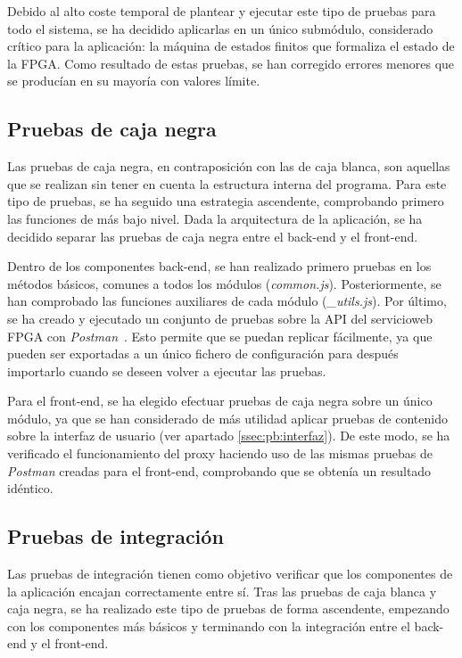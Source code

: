 Debido al alto coste temporal de plantear y ejecutar este tipo de pruebas para todo el sistema, se ha decidido aplicarlas en un único submódulo, considerado crítico para la aplicación: la máquina de estados finitos que formaliza el estado de la \gls{FPGA}.
Como resultado de estas pruebas, se han corregido errores menores que se producían en su mayoría con valores límite.

\subsection*{Pruebas de caja negra\label{ssec:pb:caja_negra}}

Las pruebas de caja negra, en contraposición con las de caja blanca, son aquellas que se realizan sin tener en cuenta la estructura interna del programa.
Para este tipo de pruebas, se ha seguido una estrategia ascendente, comprobando primero las funciones de más bajo nivel.
Dada la arquitectura de la aplicación, se ha decidido separar las pruebas de caja negra entre el \gls{back-end} y el \gls{front-end}.

Dentro de los componentes \gls{back-end}, se han realizado primero pruebas en los métodos básicos, comunes a todos los módulos (\textit{common.js}).
Posteriormente, se han comprobado las funciones auxiliares de cada módulo (\textit{\_utils.js}).
Por último, se ha creado y ejecutado un conjunto de pruebas sobre la \gls{API} del \gls{servicioweb} \gls{FPGA} con \textit{Postman}~\cite{postman}.
Esto permite que se puedan replicar fácilmente, ya que pueden ser exportadas a un único fichero de configuración para después importarlo cuando se deseen volver a ejecutar las pruebas.

Para el \gls{front-end}, se ha elegido efectuar pruebas de caja negra sobre un único módulo, ya que se han considerado de más utilidad aplicar pruebas de contenido sobre la interfaz de usuario (ver apartado \ref{ssec:pb:interfaz}).
De este modo, se ha verificado el funcionamiento del \gls{proxy} haciendo uso de las mismas pruebas de \textit{Postman} creadas para el \gls{front-end}, comprobando que se obtenía un resultado idéntico.

\subsection*{Pruebas de integración\label{ssec:pb:integracion}}

Las pruebas de integración tienen como objetivo verificar que los componentes de la aplicación encajan correctamente entre sí.
Tras las pruebas de caja blanca y caja negra, se ha realizado este tipo de pruebas de forma ascendente, empezando con los componentes más básicos y terminando con la integración entre el \gls{back-end} y el \gls{front-end}.

